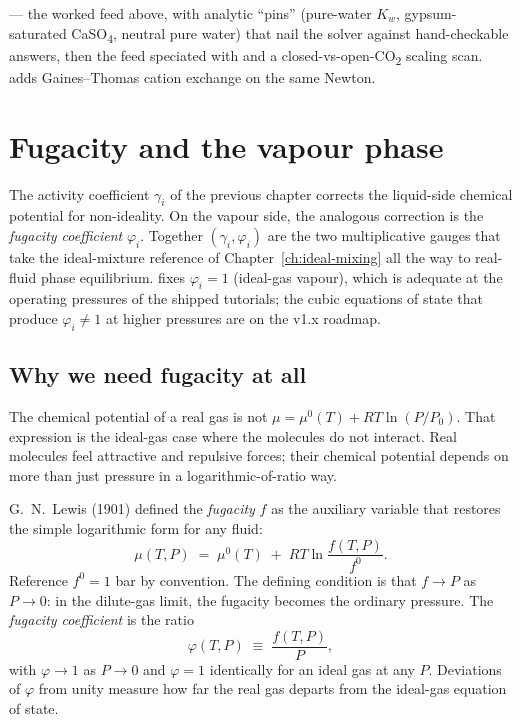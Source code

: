\documentclass[11pt,a4paper]{article}
\begin{document}
\begin{tutoriallink}
 --- the worked
feed above, with analytic ``pins'' (pure-water $K_w$, gypsum-saturated
CaSO\textsubscript{4}, neutral pure water) that nail the solver against
hand-checkable answers, then the feed speciated with  and
a closed-vs-open-CO\textsubscript{2} scaling scan.
 adds Gaines--Thomas
cation exchange on the same Newton.
\end{tutoriallink}

\section{Fugacity and the vapour phase}\label{ch:fugacity}

\begin{whatyoulllearn}
The activity coefficient $\gamma_i$ of the previous chapter
corrects the liquid-side chemical potential for non-ideality.  On
the vapour side, the analogous correction is the
\emph{fugacity coefficient} $\varphi_i$.  Together $(\gamma_i,
\varphi_i)$ are the two multiplicative gauges that take the
ideal-mixture reference of Chapter~\ref{ch:ideal-mixing} all the way
to real-fluid phase equilibrium. fixes $\varphi_i = 1$
(ideal-gas vapour), which is adequate at the operating pressures of
the shipped tutorials; the cubic equations of state that produce
$\varphi_i \neq 1$ at higher pressures are on the v1.x roadmap.
\end{whatyoulllearn}

\subsection{Why we need fugacity at all}

The chemical potential of a real gas is not $\mu = \mu^0(T) + RT \ln
(P/P_0)$.  That expression is the ideal-gas case where the molecules
do not interact.  Real molecules feel attractive and repulsive
forces; their chemical potential depends on more than just pressure
in a logarithmic-of-ratio way.

G.~N.~Lewis (1901) defined the \emph{fugacity} $f$ as the auxiliary
variable that restores the simple logarithmic form for any fluid:
\begin{equation}
   \boxed{\;
   \mu(T, P) \;=\; \mu^0(T) \;+\; RT \ln \frac{f(T, P)}{f^0}.
   \;}
   \label{eq:fugacity-def}
\end{equation}
Reference $f^0 = 1$ bar by convention.  The defining condition is
that $f \to P$ as $P \to 0$: in the dilute-gas limit, the fugacity
becomes the ordinary pressure.  The \emph{fugacity coefficient} is
the ratio
\begin{equation}
   \varphi(T, P) \;\equiv\; \frac{f(T, P)}{P},
\end{equation}
with $\varphi \to 1$ as $P \to 0$ and $\varphi = 1$ identically for
an ideal gas at any $P$.  Deviations of $\varphi$ from unity measure
how far the real gas departs from the ideal-gas equation of state.
\end{document}
